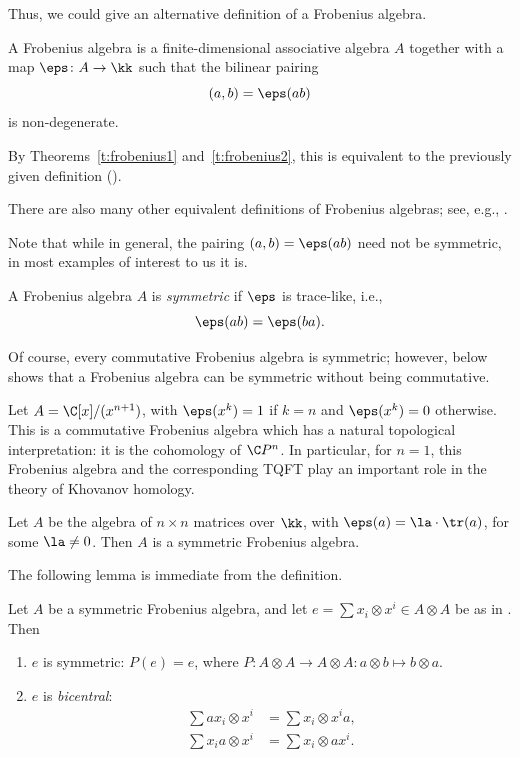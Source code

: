 Thus, we could give an alternative definition of a Frobenius algebra.
\begin{definition}\label{d:frobenius2}
  A Frobenius algebra is a finite-dimensional associative algebra
  $A$ together with a map $\eps \colon A\to \kk$ such that the
  bilinear pairing
  \begin{equation}\label{e:frob-pairing}
    (a,b) = \eps(ab)
  \end{equation}
  is non-degenerate.
\end{definition}
By Theorems~\ref{t:frobenius1} and~\ref{t:frobenius2}, this is equivalent to the
previously given definition ().

There are also many other equivalent definitions of Frobenius
algebras; see, e.g., \cite[Section 2.2]{kock}.

Note that while in general, the pairing $(a,b) = \eps(ab)$ need not
be symmetric, in most examples of interest to us it is.
\begin{definition}\label{d:frobenius_symmetric}
  A Frobenius algebra $A$ is \emph{symmetric} if $\eps$ is trace-like, i.e.,
  $$
    \eps(ab)=\eps(ba).
  $$
\end{definition}
Of course, every commutative Frobenius algebra is symmetric;
however,  below shows that a Frobenius algebra can be
symmetric without being commutative.

\begin{example}\label{x:frobenius1}
  Let $A=\C[x]/(x^{n+1})$, with $\eps(x^k)=1$ if $k=n$ and
  $\eps(x^k)=0$ otherwise. This is a commutative Frobenius algebra which
  has a natural topological interpretation: it is the cohomology of
  $\C P^n$. In particular, for $n=1$, this Frobenius algebra and the
  corresponding TQFT play an important role in the theory of Khovanov
  homology.
\end{example}
\begin{example} \label{x:frobenius2}
  Let $A$ be the algebra of $n\times n$ matrices over $\kk$,
  with $\eps(a)=\la\cdot\tr(a)$, for some $\la\ne 0$. Then $A$
  is a symmetric Frobenius algebra.
\end{example}

The following lemma is immediate from the definition.
\begin{lemma}\label{l:bicentral}
  Let $A$ be a symmetric Frobenius algebra, and let
  $e=\sum x_i\otimes x^i\in A\otimes A$ be as in . Then
  \begin{enumerate}
    \item $e$ is symmetric: $P(e)=e$, where $P\colon A\otimes A\to A\otimes
    A\colon a\otimes b\mapsto b\otimes a$.
    \item $e$ is \emph{bicentral}:
    \begin{align*}
      \sum ax_i\otimes x^i&=\sum x_i\otimes x^i a,\\
      \sum x_ia\otimes x^i&=\sum x_i\otimes ax^i.
      \end{align*}
    \end{enumerate}
\end{lemma}
